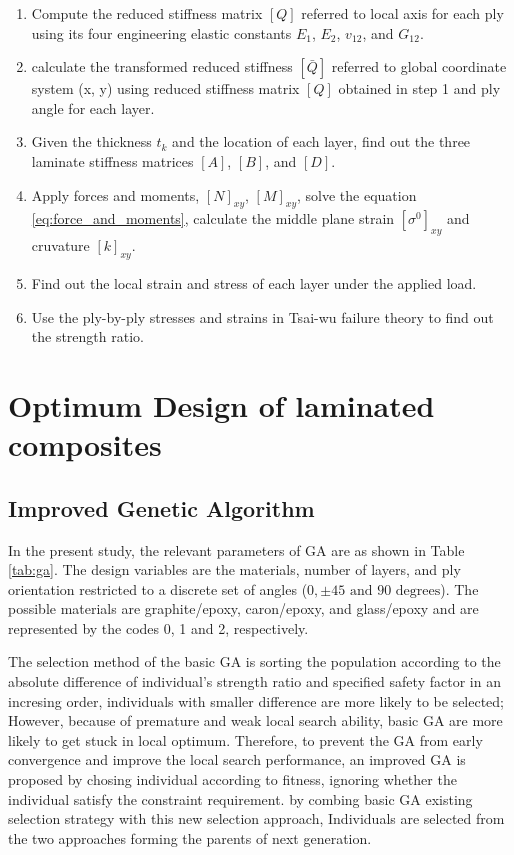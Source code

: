 \documentclass[smallextended]{svjour3}       %
\begin{document}
\begin{enumerate}
	\item Compute the reduced stiffness matrix $[Q]$ referred to local axis for each ply using its
		four engineering elastic constants $E_1$, $E_2$, $v_{12}$, and $G_{12}$.
	\item calculate the transformed reduced stiffness $[\bar{Q}]$ referred to global coordinate
		system (x, y) using reduced stiffness matrix $[Q]$ obtained in step 1 and ply angle for each layer.
	\item Given the thickness $t_k$ and the location of each layer, find out the three laminate
		stiffness matrices $[A]$, $[B]$, and $[D]$.
	\item Apply forces and moments, $[N]_{xy}$, $[M]_{xy}$, solve the equation
		\ref{eq:force_and_moments}, calculate the middle plane strain $[\sigma^0]_{xy}$ and
		cruvature $[k]_{xy}$.
	\item Find out the local strain and stress of each layer under the applied load.
	\item Use the ply-by-ply stresses and strains in Tsai-wu failure theory to find out the strength
		ratio.
\end{enumerate}

\section {Optimum Design of laminated composites}
\subsection{Improved Genetic Algorithm}
In the present study, the relevant parameters of GA are as shown in Table \ref{tab:ga}. The design
variables are the materials, number of layers, and ply orientation restricted to a discrete set of
angles ($0,\pm 45 \text{ and } 90 \text{ degrees} $). The possible materials are graphite/epoxy,
caron/epoxy, and glass/epoxy and are represented by the codes 0, 1 and 2, respectively.

The selection method of the basic GA is sorting the population according to the absolute difference
of individual's strength ratio and specified safety factor in an incresing order, individuals with
smaller difference are more likely to be selected; However, because of premature and weak local
search ability, basic GA are more likely to get stuck in local optimum. Therefore, to prevent the GA
from early convergence and improve the local search performance, an improved GA is proposed by
chosing individual according to fitness,  ignoring whether the individual satisfy the constraint
requirement. by combing basic GA existing selection strategy with this new selection approach,
Individuals are selected from the two approaches forming the parents of next generation.
\end{document}
